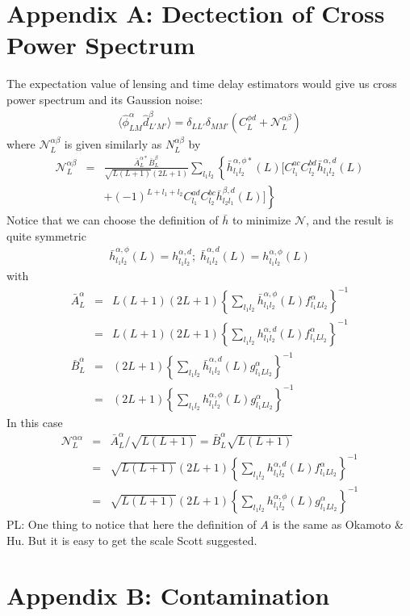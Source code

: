 \documentclass[prl,amsmath,amssymb,floatfix,superscriptaddress,nofootinbib,twocolumn]{revtex4-1}
\def\bea{\begin{eqnarray}}
\def\eea{\end{eqnarray}}
\newcommand{\eql}[1]{\label{eq:#1}}
\newcommand{\peikai}[1]{{\color{blue} PL: #1}}
\begin{document}
\section{Appendix A: Dectection of Cross Power Spectrum}
The expectation value of lensing and time delay estimators would give us cross power spectrum and its Gaussion noise:
\bea
\langle \hat{\phi}^{\alpha}_{LM} \hat{d}^{\beta}_{L'M'}\rangle = \delta_{LL'}\delta_{MM'}(C_{L}^{\phi d}+\mathcal{N}_{L}^{\alpha \beta})
\eea
where $\mathcal{N}^{\alpha \beta}_{L}$ is given similarly as $N_{L}^{\alpha \beta}$ by
\bea
\mathcal{N}_{L}^{\alpha\beta}&=&\frac{\bar{A}_{L}^{\alpha*}\bar{B}_{L}^{\beta}}{\sqrt{L(L+1)}(2L+1)}\sum_{l_{1}l_{2}}  \left\{ \bar{h}_{l_{1}l_{2}}^{\alpha,\phi*} (L)\big[ C_{l_{1}}^{ac}C_{l_{2}}^{bd}\bar{h}_{l_{1}l_{2}}^{\alpha,d}(L)\right. \nonumber \\
&&\left. +(-1)^{L+l_{1}+l_{2}}C_{l_{1}}^{ad}C_{l_{2}}^{bc} \bar{h}_{l_{2}l_{1}}^{\beta,d}(L)  \big]\right\}\eql{full}
\eea
Notice that we can choose the definition of $\bar{h}$ to minimize $\mathcal{N}$, and the result is quite symmetric
\bea 
\bar{h}_{l_{1}l_{2}}^{\alpha,\phi}(L) =h_{l_{1}l_{2}}^{\alpha,d}; \; \bar{h}_{l_{1}l_{2}}^{\alpha,d}(L)= h_{l_{1}l_{2}}^{\alpha,\phi} (L)
\eea 
with 
\bea 
\bar{A}_{L}^{\alpha} &=& L(L+1)(2L+1)\left\{ \sum_{l_{1}l_{2}}\bar{h}_{l_{1}l_{2}}^{\alpha,\phi}(L)f_{l_{1}Ll_{2}}^{\alpha} \right\}^{-1} \nonumber \\
&=& L(L+1)(2L+1)\left\{ \sum_{l_{1}l_{2}}h_{l_{1}l_{2}}^{\alpha,d}(L)f_{l_{1}Ll_{2}}^{\alpha} \right\}^{-1} \\
\bar{B}_{L}^{\alpha} &=& (2L+1)\left\{ \sum_{l_{1}l_{2}}\bar{h}_{l_{1}l_{2}}^{\alpha,d}(L)g_{l_{1}Ll_{2}}^{\alpha} \right\}^{-1} \nonumber \\
&=& (2L+1)\left\{ \sum_{l_{1}l_{2}}h_{l_{1}l_{2}}^{\alpha,\phi}(L)g_{l_{1}Ll_{2}}^{\alpha} \right\}^{-1}
\eea 
In this case
\bea
\mathcal{N}_{L}^{\alpha \alpha} &=& \bar{A}_{L}^{\alpha} /\sqrt{L(L+1)}=\bar{B}_{L}^{\alpha}  \sqrt{L(L+1)} \nonumber \\
&=& \sqrt{L(L+1)}(2L+1)\left\{ \sum_{l_{1}l_{2}}h_{l_{1}l_{2}}^{\alpha,d}(L)f_{l_{1}Ll_{2}}^{\alpha} \right\}^{-1} \nonumber \\
&=& \sqrt{L(L+1)}(2L+1)\left\{ \sum_{l_{1}l_{2}}h_{l_{1}l_{2}}^{\alpha,\phi}(L)g_{l_{1}Ll_{2}}^{\alpha} \right\}^{-1}
\eea
\peikai{One thing to notice that here the definition of $A$ is the same as Okamoto \& Hu. But it is easy to get the scale Scott suggested.}

\section{Appendix B: Contamination}
\end{document}
